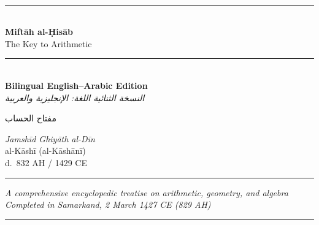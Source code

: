 \documentclass[11pt,a4paper]{article}
\newcommand{\longline}{\noindent\rule{\textwidth}{0.4pt}}
\newcommand{\shortline}{\noindent\rule{0.5\textwidth}{0.4pt}\par}
\newcommand{\ar}[1]{{\arabicfont\beginR #1\endR}}
\newcommand{\arbf}[1]{{\arabicfontbf\beginR #1\endR}}
\newenvironment{arabicbox}{%
  \begin{framed}
  \begin{minipage}{\dimexpr\linewidth-2\fboxsep-2\fboxrule\relax}
  \setlength{\parindent}{0pt}
  \linespread{1.3}\selectfont
}{%
  \end{minipage}
  \end{framed}
}
\begin{document}
\thispagestyle{empty}
\begin{center}
\vspace*{1.5cm}

{\fontsize{14}{16}\selectfont\ar{بسم الله الرحمن الرحيم}}\\[0.8cm]

{\color{rulecolor}\longline}\\[0.6cm]

{\fontsize{28}{34}\selectfont\bfseries\color{titlecolor}
Mift\=ah al-\d{H}is\=ab}\\[0.5cm]
{\fontsize{18}{22}\selectfont\color{sectioncolor}
The Key to Arithmetic}\\[0.3cm]
{\color{rulecolor}\longline}\\[0.8cm]

{\Large\textbf{Bilingual English--Arabic Edition}}\\[0.3cm]
{\large\textit{\ar{النسخة الثنائية اللغة: الإنجليزية والعربية}}}\\[1cm]

\begin{arabicbox}
\begin{center}
{\Large\arbf{مفتاح الحساب}}
\end{center}
\end{arabicbox}

\vspace{0.8cm}

{\Large\textit{Jamsh\=id Ghiy\=ath al-D\=in}}\\[0.3cm]
{\large al-K\=ash\=i (al-K\=ash\=an\=i)}\\[0.2cm]
{\normalsize d.\ 832 AH / 1429 CE}\\[1cm]

{\color{rulecolor}\shortline}

\vspace{0.5cm}

{\small\textit{A comprehensive encyclopedic treatise on arithmetic, geometry, and algebra}}\\[0.2cm]
{\small\textit{Completed in Samarkand, 2 March 1427 CE (829 AH)}}\\[0.5cm]

{\color{rulecolor}\longline}\\[0.8cm]


\end{center}
\end{document}
